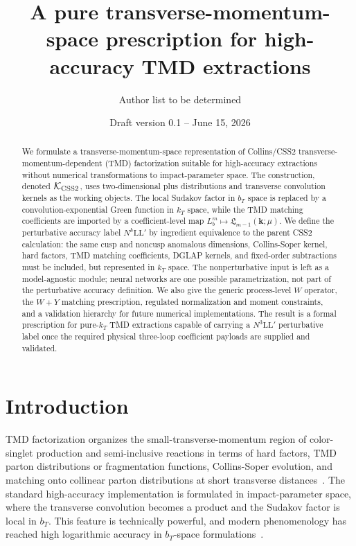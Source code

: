 \documentclass[aps,prd,preprint,superscriptaddress,nofootinbib,longbibliography]{revtex4-2}
\newcommand{\bk}{\bm k}
\newcommand{\KCSS}{\mathcal K_{\rm CSS2}}
\newcommand{\NthreeLLp}{N^3\mathrm{LL}'}
\begin{document}
\title{A pure transverse-momentum-space prescription for high-accuracy TMD extractions}

\author{Author list to be determined}

\date{Draft version 0.1 -- June 15, 2026}

\begin{abstract}
We formulate a transverse-momentum-space representation of Collins/CSS2 transverse-momentum-dependent (TMD) factorization suitable for high-accuracy extractions without numerical transformations to impact-parameter space.  The construction, denoted $\KCSS$, uses two-dimensional plus distributions and transverse convolution kernels as the working objects.  The local Sudakov factor in $b_T$ space is replaced by a convolution-exponential Green function in $k_T$ space, while the TMD matching coefficients are imported by a coefficient-level map $L_b^m\mapsto \mathfrak L_{m-1}(\bk;\mu)$.  We define the perturbative accuracy label $N^k\mathrm{LL}'$ by ingredient equivalence to the parent CSS2 calculation: the same cusp and noncusp anomalous dimensions, Collins-Soper kernel, hard factors, TMD matching coefficients, DGLAP kernels, and fixed-order subtractions must be included, but represented in $k_T$ space.  The nonperturbative input is left as a model-agnostic module; neural networks are one possible parametrization, not part of the perturbative accuracy definition.  We also give the generic process-level $W$ operator, the $W+Y$ matching prescription, regulated normalization and moment constraints, and a validation hierarchy for future numerical implementations.  The result is a formal prescription for pure-$k_T$ TMD extractions capable of carrying a $\NthreeLLp$ perturbative label once the required physical three-loop coefficient payloads are supplied and validated.
\end{abstract}

\maketitle

\section{Introduction}

TMD factorization organizes the small-transverse-momentum region of color-singlet production and semi-inclusive reactions in terms of hard factors, TMD parton distributions or fragmentation functions, Collins-Soper evolution, and matching onto collinear parton distributions at short transverse distances~\cite{CollinsSoper1981,CSS1985,Collins2011,TMDHandbook2023}.  The standard high-accuracy implementation is formulated in impact-parameter space, where the transverse convolution becomes a product and the Sudakov factor is local in $b_T$.  This feature is technically powerful, and modern phenomenology has reached high logarithmic accuracy in $b_T$-space formulations~\cite{MoosScimemiVladimirovZurita2024,MoosScimemiVladimirovZurita2025,BillisMichelTackmann2025}.
\end{document}
